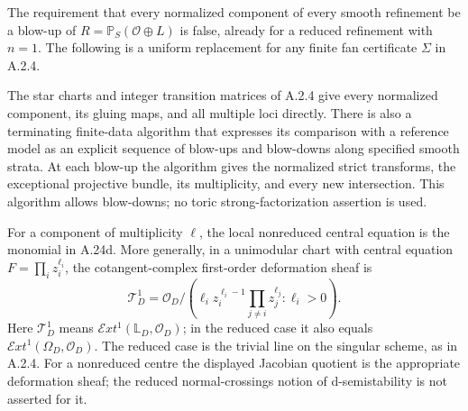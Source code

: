 \begin{proposition}\label{push:src:A.2.5}\label{push:A25}
The requirement that every normalized component of every
smooth refinement be a blow-up of
$R=\mathbb P_S(\mathcal O\oplus L)$ is false, already
for a reduced refinement with $n=1$.
The following is a uniform replacement for any finite
fan certificate $\Sigma$ in A.2.4.

The star charts and integer transition matrices of A.2.4
give every normalized component, its gluing maps, and
all multiple loci directly. There is also a terminating
finite-data algorithm that expresses its comparison
with a reference model as an explicit sequence of
blow-ups and blow-downs along specified smooth strata.
At each blow-up the algorithm gives the normalized
strict transforms, the exceptional projective bundle,
its multiplicity, and every new intersection.
This algorithm allows blow-downs; no toric
strong-factorization assertion is used.

For a component of multiplicity $\ell$, the local
nonreduced central equation is the monomial in A.24d.
More generally, in a unimodular chart with central
equation $F=\prod_i z_i^{\ell_i}$, the cotangent-complex
first-order deformation sheaf is
\[
 \mathcal T^1_D
  =\mathcal O_D\Big/
    \left(\ell_i z_i^{\ell_i-1}
          \prod_{j\ne i}z_j^{\ell_j}:\ell_i>0\right).
 \tag{A.25a}
\]
Here $\mathcal T^1_D$ means
$\mathcal Ext^1(\mathbb L_D,\mathcal O_D)$; in the
reduced case it also equals
$\mathcal Ext^1(\Omega_D,\mathcal O_D)$.
The reduced case is the trivial line on the singular
scheme, as in A.2.4. For a nonreduced centre the displayed
Jacobian quotient is the appropriate deformation sheaf;
the reduced normal-crossings notion of d-semistability
is not asserted for it.
\end{proposition}
